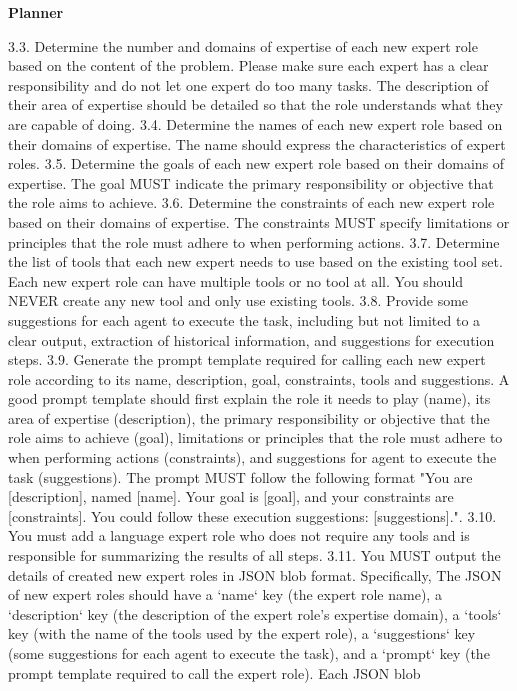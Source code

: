 \begin{frame}[Prompt]{\textbf{Planner}}
\begin{code}
3.3. Determine the number and domains of expertise of each new expert role based on 
the content of the problem. Please make sure each expert has a clear responsibility 
and do not let one expert do too many tasks. The description of their area of 
expertise should be detailed so that the role understands what they are capable of 
doing. 
3.4. Determine the names of each new expert role based on their domains of 
expertise. The name should express the characteristics of expert roles. 
3.5. Determine the goals of each new expert role based on their domains of 
expertise. The goal MUST indicate the primary responsibility or objective that the 
role aims to achieve. 
3.6. Determine the constraints of each new expert role based on their domains of 
expertise. The constraints MUST specify limitations or principles that the role 
must adhere to when performing actions. 
3.7. Determine the list of tools that each new expert needs to use based on the 
existing tool set. Each new expert role can have multiple tools or no tool at all. 
You should NEVER create any new tool and only use existing tools.
3.8. Provide some suggestions for each agent to execute the task, including but not 
limited to a clear output, extraction of historical information, and suggestions 
for execution steps. 
3.9. Generate the prompt template required for calling each new expert role 
according to its name, description, goal, constraints, tools and suggestions.  A 
good prompt template should first explain the role it needs to play (name), its 
area of expertise (description), the primary responsibility or objective that the 
role aims to achieve (goal), limitations or principles that the role must adhere to 
when performing actions (constraints), and suggestions for agent to execute the 
task (suggestions). The prompt MUST follow the following format "You are 
[description], named [name]. Your goal is [goal], and your constraints are 
[constraints]. You could follow these execution suggestions: [suggestions].".
3.10. You must add a language expert role who does not require any tools and is 
responsible for summarizing the results of all steps.
3.11. You MUST output the details of created new expert roles in JSON blob format. 
Specifically, The JSON of new expert roles should have a `name` key (the expert 
role name), a `description` key (the description of the expert role's expertise 
domain), a `tools` key (with the name of the tools used by the expert role), a 
`suggestions` key (some suggestions for each agent to execute the task), and a 
`prompt` key (the prompt template required to call the expert role). Each JSON blob 

\end{code}
\end{frame}
